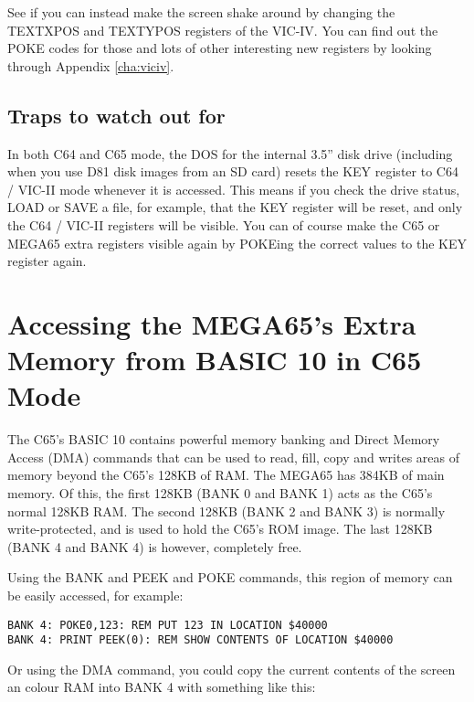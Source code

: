 See if you can instead make the screen shake around by changing the TEXTXPOS and TEXTYPOS registers of
the VIC-IV.  You can find out the POKE codes for those and lots of other interesting new registers
by looking through Appendix \ref{cha:viciv}.

\subsection{Traps to watch out for}

In both C64 and C65 mode, the DOS for the internal 3.5'' disk drive (including when you use D81 disk images from
an SD card) resets the KEY register to C64 / VIC-II mode whenever it is accessed. This means if you check the drive
status, LOAD or SAVE a file, for example, that the KEY register will be reset, and only the C64 / VIC-II registers
will be visible. You can of course make the C65 or MEGA65 extra registers visible again by POKEing the correct values
to the KEY register again.

\section{Accessing the MEGA65's Extra Memory from BASIC 10 in C65 Mode}

The C65's BASIC 10 contains powerful memory banking and Direct Memory Access (DMA) commands that can be used to read,
fill, copy and writes areas of memory beyond the C65's 128KB of RAM.  The MEGA65 has 384KB of main memory. Of this,
the first 128KB (BANK 0 and BANK 1) acts as the C65's normal 128KB RAM. The second 128KB (BANK 2 and BANK 3) is normally
write-protected, and is used to hold the C65's ROM image.  The last 128KB (BANK 4 and BANK 4) is however, completely free.

Using the BANK and PEEK and POKE commands, this region of memory can be easily accessed, for example:

\begin{tcolorbox}[colback=black,coltext=white]
\verbatimfont{\codefont}
\begin{verbatim}
BANK 4: POKE0,123: REM PUT 123 IN LOCATION $40000
BANK 4: PRINT PEEK(0): REM SHOW CONTENTS OF LOCATION $40000
\end{verbatim}
\end{tcolorbox}

Or using the DMA command, you could copy the current contents of the screen an colour RAM into BANK 4 with something like this:


